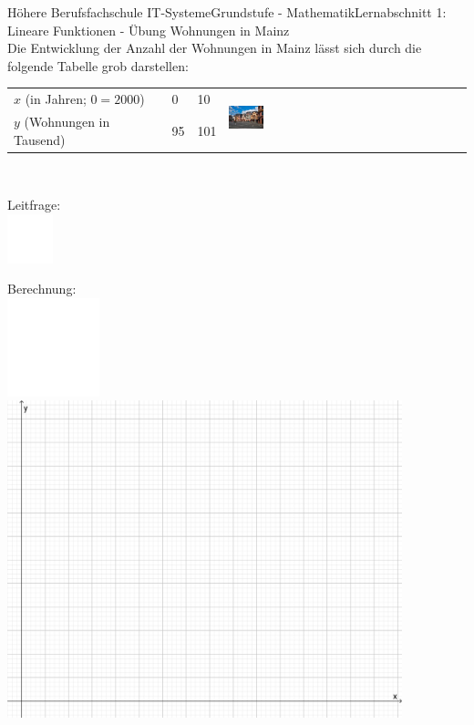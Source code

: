 \documentclass[oneside,openany,headings=optiontotoc,11pt,numbers=noenddot]{scrreprt}
\begin{document}
	\begin{worksheet}{Höhere Berufsfachschule IT-Systeme}{Grundstufe - Mathematik}{Lernabschnitt 1: Lineare Funktionen - Übung}
		\noindent
		\LARGE Wohnungen in Mainz\\
		\normalsize
		\noindent
		Die Entwicklung der Anzahl der Wohnungen in Mainz lässt sich durch die folgende Tabelle grob darstellen:\\
		\par\noindent
		\begin{tabularx}{\columnwidth}{|X|l|l|M}
			\(x\) (in Jahren; \(0 = 2000\)) & 0 & 10 & \\
			\(y\) (Wohnungen in Tausend) & 95 & 101 &\\
		\end{tabularx}\\
		\begin{framed}
			\noindent
			\small{\color{codegray}Leitfrage:}\\
			\includegraphics[width=0.1\textwidth]{../../empty.jpg}\\
		\end{framed}
		\begin{framed}
			\noindent
			\small{\color{codegray}Berechnung:}\\
			\includegraphics[width=0.2\textwidth]{../../empty.jpg}\\
			\includegraphics[width=0.86\textwidth]{../99_Bilder/KoordLeer.png}

\end{framed}
\end{worksheet}
\end{document}
